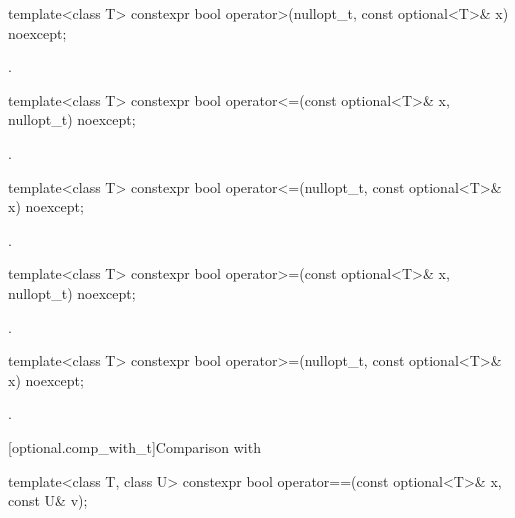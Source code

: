 %
\begin{itemdecl}
template<class T> constexpr bool operator>(nullopt_t, const optional<T>& x) noexcept;
\end{itemdecl}

\begin{itemdescr}
\pnum
\returns
{}.
\end{itemdescr}

%
\begin{itemdecl}
template<class T> constexpr bool operator<=(const optional<T>& x, nullopt_t) noexcept;
\end{itemdecl}

\begin{itemdescr}
\pnum
\returns
{}.
\end{itemdescr}

%
\begin{itemdecl}
template<class T> constexpr bool operator<=(nullopt_t, const optional<T>& x) noexcept;
\end{itemdecl}

\begin{itemdescr}
\pnum
\returns
{}.
\end{itemdescr}

%
\begin{itemdecl}
template<class T> constexpr bool operator>=(const optional<T>& x, nullopt_t) noexcept;
\end{itemdecl}

\begin{itemdescr}
\pnum
\returns
{}.
\end{itemdescr}

%
\begin{itemdecl}
template<class T> constexpr bool operator>=(nullopt_t, const optional<T>& x) noexcept;
\end{itemdecl}

\begin{itemdescr}
\pnum
\returns
{}.
\end{itemdescr}

[optional.comp_with_t]{Comparison with }

%
\begin{itemdecl}
template<class T, class U> constexpr bool operator==(const optional<T>& x, const U& v);
\end{itemdecl}

